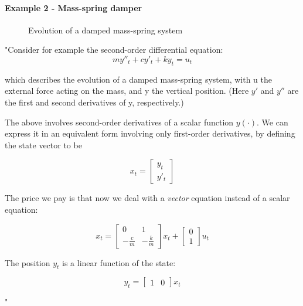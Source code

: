 \paragraph{Example 2 - Mass-spring damper}
{\em

\begin{figure}[!ht]
\centering
\caption{Evolution of a damped mass-spring system}
\label{fig:SSM_graphical_representation}
\end{figure}

"Consider for example the second-order differential equation:
\begin{equation*}
my''_t + cy'_t + ky_t = u_t
\end{equation*}

which describes the evolution of a damped mass-spring system, with u the external force acting on the mass, and y the vertical position. (Here \(y'\) and \(y''\) are the first and second derivatives of y, respectively.)

The above involves second-order derivatives of a scalar function \(y(\cdot)\). We can express it in an equivalent form involving only first-order derivatives, by defining the state vector to be

\begin{equation*}
x_t =
    \begin{bmatrix}
        y_t \\
        y'_t
    \end{bmatrix}
\end{equation*}

The price we pay is that now we deal with a \textit{vector} equation instead of a scalar equation:

\begin{equation*}
x_t =
    \begin{bmatrix}
        0 & 1 \\
        -\frac{c}{m} & -\frac{k}{m}
    \end{bmatrix}
    x_t +
        \begin{bmatrix}
        0 \\
        1
    \end{bmatrix}
    u_t
\end{equation*}

The position \(y_t\) is a linear function of the state:

\begin{equation*}
y_t =
    \begin{bmatrix}
        1 & 0
    \end{bmatrix}
    x_t
\end{equation*}
}"
\cite{noauthor_state-space_nodate}

